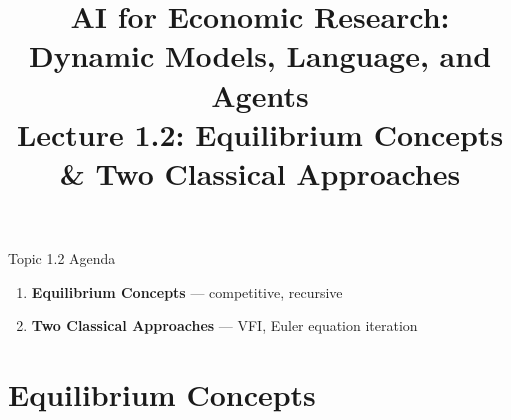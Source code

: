 


\graphicspath{{./pic/}{../../FullCourse_10Lecs/Lec01_Quant_Macro/pic/}{../}}

\title[AI for Econ Research]{AI for Economic Research: Dynamic Models, Language, and Agents\\
Lecture 1.2: Equilibrium Concepts \& Two Classical Approaches}



\makebeamertitle

\begin{frame}{Topic 1.2 Agenda}
\begin{enumerate}
  \item \textbf{Equilibrium Concepts} --- competitive, recursive
  \medskip
  \item \textbf{Two Classical Approaches} --- VFI, Euler equation iteration
\end{enumerate}
\end{frame}

\section{Equilibrium Concepts}

